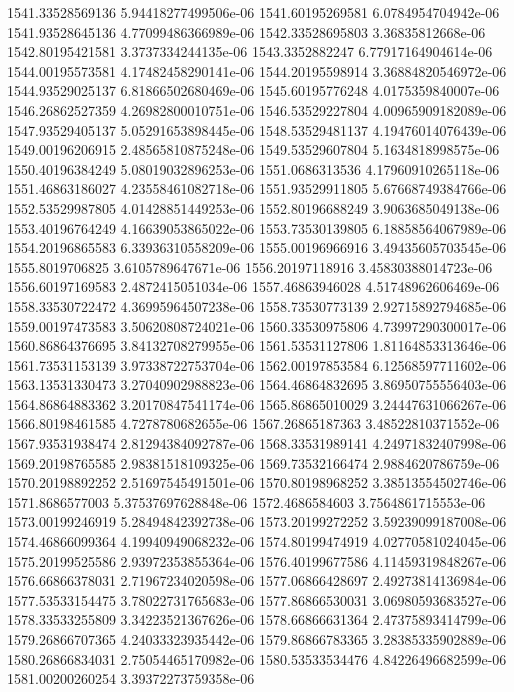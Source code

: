 {1541.33528569136 5.94418277499506e-06
1541.60195269581 6.0784954704942e-06
1541.93528645136 4.77099486366989e-06
1542.33528695803 3.36835812668e-06
1542.80195421581 3.3737334244135e-06
1543.3352882247 6.77917164904614e-06
1544.00195573581 4.17482458290141e-06
1544.20195598914 3.36884820546972e-06
1544.93529025137 6.81866502680469e-06
1545.60195776248 4.0175359840007e-06
1546.26862527359 4.26982800010751e-06
1546.53529227804 4.00965909182089e-06
1547.93529405137 5.05291653898445e-06
1548.53529481137 4.19476014076439e-06
1549.00196206915 2.48565810875248e-06
1549.53529607804 5.1634818998575e-06
1550.40196384249 5.08019032896253e-06
1551.0686313536 4.17960910265118e-06
1551.46863186027 4.23558461082718e-06
1551.93529911805 5.67668749384766e-06
1552.53529987805 4.01428851449253e-06
1552.80196688249 3.9063685049138e-06
1553.40196764249 4.16639053865022e-06
1553.73530139805 6.18858564067989e-06
1554.20196865583 6.33936310558209e-06
1555.00196966916 3.49435605703545e-06
1555.8019706825 3.6105789647671e-06
1556.20197118916 3.45830388014723e-06
1556.60197169583 2.4872415051034e-06
1557.46863946028 4.51748962606469e-06
1558.33530722472 4.36995964507238e-06
1558.73530773139 2.92715892794685e-06
1559.00197473583 3.50620808724021e-06
1560.33530975806 4.73997290300017e-06
1560.86864376695 3.84132708279955e-06
1561.53531127806 1.81164853313646e-06
1561.73531153139 3.97338722753704e-06
1562.00197853584 6.12568597711602e-06
1563.13531330473 3.27040902988823e-06
1564.46864832695 3.86950755556403e-06
1564.86864883362 3.20170847541174e-06
1565.86865010029 3.24447631066267e-06
1566.80198461585 4.7278780682655e-06
1567.26865187363 3.48522810371552e-06
1567.93531938474 2.81294384092787e-06
1568.33531989141 4.24971832407998e-06
1569.20198765585 2.98381518109325e-06
1569.73532166474 2.9884620786759e-06
1570.20198892252 2.51697545491501e-06
1570.80198968252 3.38513554502746e-06
1571.8686577003 5.37537697628848e-06
1572.4686584603 3.7564861715553e-06
1573.00199246919 5.28494842392738e-06
1573.20199272252 3.59239099187008e-06
1574.46866099364 4.19940949068232e-06
1574.80199474919 4.02770581024045e-06
1575.20199525586 2.93972353855364e-06
1576.40199677586 4.11459319848267e-06
1576.66866378031 2.71967234020598e-06
1577.06866428697 2.49273814136984e-06
1577.53533154475 3.78022731765683e-06
1577.86866530031 3.06980593683527e-06
1578.33533255809 3.34223521367626e-06
1578.66866631364 2.47375893414799e-06
1579.26866707365 4.24033323935442e-06
1579.86866783365 3.28385335902889e-06
1580.26866834031 2.75054465170982e-06
1580.53533534476 4.84226496682599e-06
1581.00200260254 3.39372273759358e-06
}
